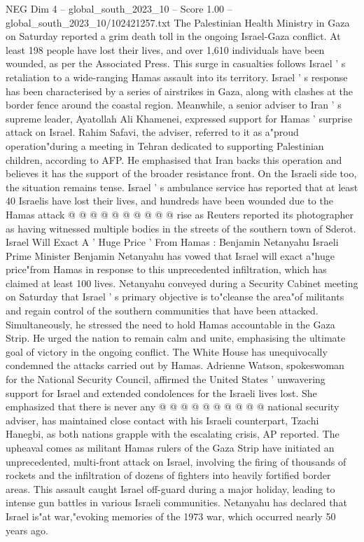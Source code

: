 \begin{textsample}{NEG Dim 4 – global\_south\_2023\_10 – Score 1.00 – global\_south\_2023\_10/102421257.txt}  \label{ex:f4_neg_034}
The Palestinian Health Ministry in Gaza on Saturday reported a grim death toll in the ongoing Israel-Gaza conflict.
At least 198 people have lost their lives, and over 1,610 individuals have been wounded, as per the Associated Press.
This surge in casualties follows Israel ' s retaliation to a wide-ranging Hamas assault into its territory.
Israel ' s response has been characterised by a series of airstrikes in Gaza, along with clashes at the border fence around the coastal region.
Meanwhile, a senior adviser to Iran ' s supreme leader, Ayatollah Ali Khamenei, expressed support for Hamas ' surprise attack on Israel.
Rahim Safavi, the adviser, referred to it as a"proud operation"during a meeting in Tehran dedicated to supporting Palestinian children, according to AFP.
He emphasised that Iran backs this operation and believes it has the support of the broader resistance front.
On the Israeli side too, the situation remains tense.
Israel ' s ambulance service has reported that at least 40 Israelis have lost their lives, and hundreds have been wounded due to the Hamas attack @ @ @ @ @ @ @ @ @ @ rise as Reuters reported its photographer as having witnessed multiple bodies in the streets of the southern town of Sderot.
Israel Will Exact A ' Huge Price ' From Hamas : Benjamin Netanyahu Israeli Prime Minister Benjamin Netanyahu has vowed that Israel will exact a"huge price"from Hamas in response to this unprecedented infiltration, which has claimed at least 100 lives.
Netanyahu conveyed during a Security Cabinet meeting on Saturday that Israel ' s primary objective is to"cleanse the area"of militants and regain control of the southern communities that have been attacked.
Simultaneously, he stressed the need to hold Hamas accountable in the Gaza Strip.
He urged the nation to remain calm and unite, emphasising the ultimate goal of victory in the ongoing conflict.
The White House has unequivocally condemned the attacks carried out by Hamas.
Adrienne Watson, spokeswoman for the National Security Council, affirmed the United States ' unwavering support for Israel and extended condolences for the Israeli lives lost.
She emphasized that there is never any @ @ @ @ @ @ @ @ @ @ national security adviser, has maintained close contact with his Israeli counterpart, Tzachi Hanegbi, as both nations grapple with the escalating crisis, AP reported.
The upheaval comes as militant Hamas rulers of the Gaza Strip have initiated an unprecedented, multi-front attack on Israel, involving the firing of thousands of rockets and the infiltration of dozens of fighters into heavily fortified border areas.
This assault caught Israel off-guard during a major holiday, leading to intense gun battles in various Israeli communities.
Netanyahu has declared that Israel is"at war,"evoking memories of the 1973 war, which occurred nearly 50 years ago.

\end{textsample}
